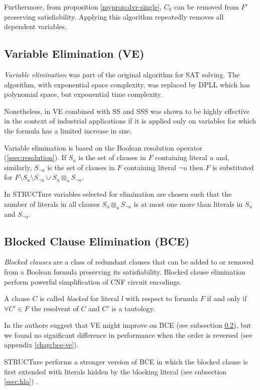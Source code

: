 Furthermore, from proposition \ref{myprop:dvr-single}, $C_0$ can be
removed from $F'$ preserving satisfiability. Applying this algorithm
repeatedly removes all dependent variables.


\subsection{Variable Elimination (VE)}
\label{ssec:ve}

\emph{Variable elimination} \cite{Davis:1960:CPQ:321033.321034}
was part of the original algorithm for SAT solving. The algorithm,
with exponential space complexity, was replaced by DPLL which
has polynomial space, but exponential time complexity.

Nonetheless, in
\cite{Subbarayan04niver:non,Een05effectivepreprocessing} VE combined
with SS and SSS was shown to be highly effective in the context
of industrial applications if it is applied only on variables for
which the formula has a limited increase in size.

Variable elimination is based on the Boolean resolution operator
(\ref{ssec:resolution}). If $S_u$ is the set of clauses in $F$
containing literal $u$ and, similarly, $S_{\neg u}$ is the set of clauses in $F$
containing literal ${\neg u}$ then $F$ is substituted for
$F \setminus S_u \setminus S_{\neg u} \cup S_u \otimes_{u} S_{\neg u}$.

In STRUCTure variables selected for elimination are chosen such that
the number of literals in all clauses $S_u \otimes_{u} S_{\neg u}$
is at most one more than literals in $S_u$ and $S_{\neg u}$.


\subsection{Blocked Clause Elimination (BCE)}
\label{ssec:bce}

\emph{Blocked clauses} are a class of redundant clauses that can
be added to \cite{Kullmann:1999:NMD:312269.312271} or removed
from \cite{Jarvisalo_blockedclause} a Boolean formula preserving
its satisfiability. Blocked clause elimination perform powerful
simplification of CNF circuit encodings.

\begin{mydef}
  A clause $C$ is called \emph{blocked}
  for literal $l$ with respect to formula $F$ if and only if $\forall
  C' \in F$ the resolvent of $C$ and $C'$ is a tautology.
\end{mydef}

In \cite{Jarvisalo_blockedclause} the authors suggest that VE might
improve on BCE (see subsection \ref{ssec:bce}), but we found no
significant difference in performance when the order is reversed
(see appendix \ref{chap:bce-ve}).

STRUCTure performs a stronger version of BCE in which the blocked clause
is first extended with literals hidden by the blocking literal
(see subsection \ref{ssec:hla}) \cite{Heule_coveredclause}.
